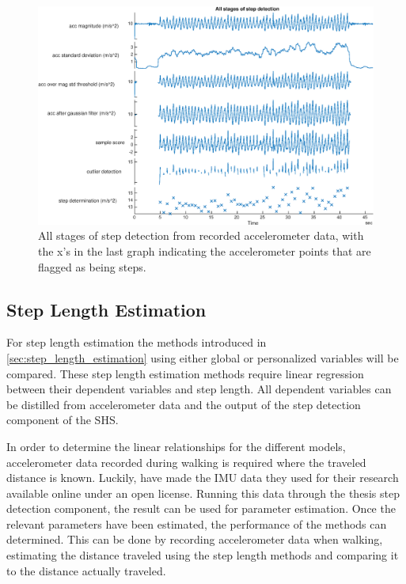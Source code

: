 \begin{figure}[H]
	\centering
	\includegraphics[width=1\linewidth]{images/20200924_1204_All_stages_of_step_detection}
	\caption[All stages of step detection ]{All stages of step detection from recorded accelerometer data, with the x's in the last graph indicating the accelerometer points that are flagged as being steps. }
	\label{fig:all_stages_of_step_detection}
\end{figure}

\subsection{Step Length Estimation}
For step length estimation the methods introduced in \cref{sec:step_length_estimation} using either global or personalized variables will be compared. These step length estimation methods require linear regression between their dependent variables and step length. All dependent variables can be distilled from accelerometer data and the output of the step detection component of the \ac{SHS}. \par 

In order to determine the linear relationships for the different models, accelerometer data recorded during walking is required where the traveled distance is known. Luckily, \cite{Vezocnik2019} have made the IMU data they used for their research available online under an open license. Running this data through the thesis step detection component, the result can be used for parameter estimation. Once the relevant parameters have been estimated, the performance of the methods can determined. This can be done by recording accelerometer data when walking, estimating the distance traveled using the step length methods and comparing it to the distance actually traveled.

